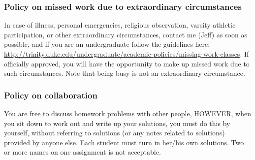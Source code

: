 \documentclass[12pt]{article}
\begin{document}
\subsubsection*{Policy on missed work due to extraordinary circumstances}

In case of illness, personal emergencies, religious observation, varsity athletic participation, or other extraordinary circumstances, contact me (Jeff) as soon as possible, and if you are an undergraduate follow the guidelines here:
\url{http://trinity.duke.edu/undergraduate/academic-policies/missing-work-classes}.
If officially approved, you will have the opportunity to make up missed work due to such circumstances.
Note that being busy is not an extraordinary circumstance.


\subsubsection*{Policy on collaboration}

You are free to discuss homework problems with other people, HOWEVER, when you sit down to work out and write up your solutions, you must do this by yourself, without referring to solutions (or any notes related to solutions) provided by anyone else. Each student must turn in her/his own solutions. Two or more names on one assignment is not acceptable.







\end{document}
